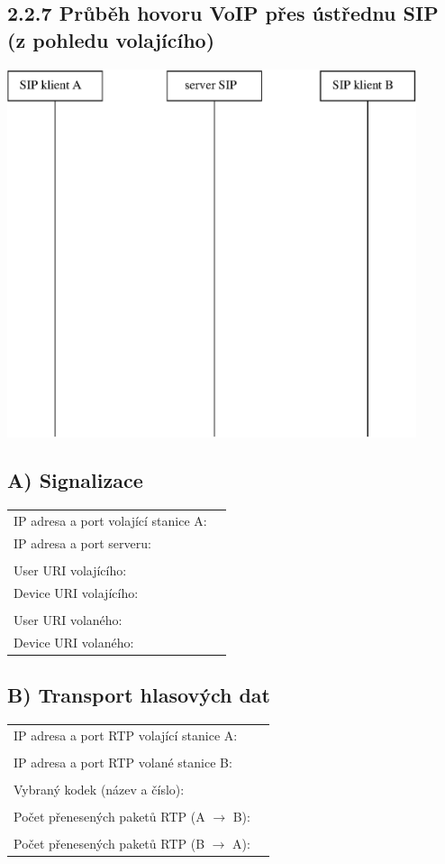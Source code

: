 \documentclass[a4paper,11pt]{article}
\begin{document}
\subsection*{2.2.7 Průběh hovoru VoIP přes ústřednu SIP (z pohledu volajícího)}
  \begin{center}    
    \includegraphics[width=120mm]{img/pres-ustrednu.eps}
  \end{center}
  \vspace{1cm}

  \subsection*{A) Signalizace}
  \begin{tabular}{lp{2cm}}
    IP adresa a port volající stanice A: &\\
    IP adresa a port serveru: &\\
    &\\
    User URI volajícího: &\\
    Device URI volajícího: &\\
    &\\
    User URI volaného: &\\
    Device URI volaného: &\\
  \end{tabular}               

  \subsection*{B) Transport hlasových dat}
  \begin{tabular}{lp{2cm}}
    IP adresa a port RTP volající stanice A: &\\
    &\\
    IP adresa a port RTP volané stanice B: &\\
    &\\
    Vybraný kodek (název a číslo): &\\
    &\\
    Počet přenesených paketů RTP (A $\rightarrow$ B): &\\
    &\\
    Počet přenesených paketů RTP (B $\rightarrow$ A): &\\
\end{tabular}               
\end{document}
